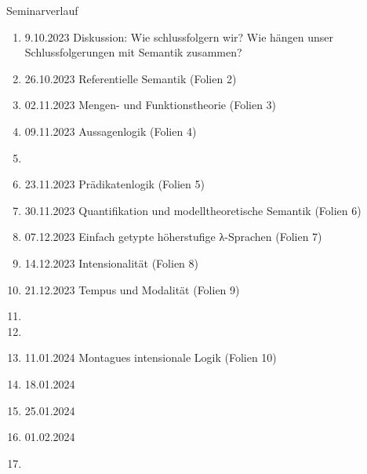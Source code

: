 \begin{frame}
  {Seminarverlauf}
  \onslide<+->
  \begin{enumerate}[<+->]\Lf\scriptsize
    \item \alert{9.10.2023} Diskussion: Wie schlussfolgern wir? Wie hängen unser Schlussfolgerungen mit Semantik zusammen?
    \item \alert{26.10.2023} Referentielle Semantik (Folien 2)
    \item \alert{02.11.2023} Mengen- und Funktionstheorie (Folien 3)
    \item \alert{09.11.2023} Aussagenlogik (Folien 4)
    \item[\rule{1.2em}{1.2em}] 
    \item \alert{23.11.2023} Prädikatenlogik (Folien 5)
    \item \alert{30.11.2023} Quantifikation und modelltheoretische Semantik (Folien 6)
    \item \alert{07.12.2023} Einfach getypte höherstufige λ-Sprachen (Folien 7)
    \item \alert{14.12.2023} Intensionalität (Folien 8)
    \item \alert{21.12.2023} Tempus und Modalität (Folien 9)
    \item[\rule{1.2em}{1.2em}] 
    \item[\rule{1.2em}{1.2em}] 
    \item \alert{11.01.2024} Montagues intensionale Logik (Folien 10)
    \item \alert{18.01.2024} 
    \item \alert{25.01.2024} 
    \item \alert{01.02.2024} 
    \item[\rule{1.2em}{1.2em}] 
  \end{enumerate}
\end{frame}

